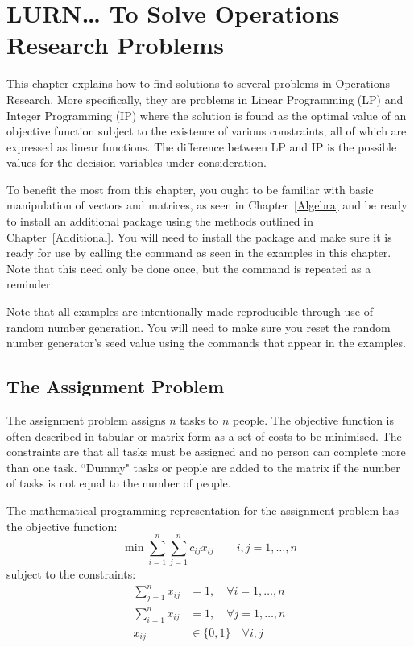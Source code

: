 



\chapter{LURN\ldots{} To Solve Operations Research Problems}
\label{OperRes}




This chapter explains how to find solutions to several problems in Operations Research. More specifically, they are problems in Linear Programming (LP) and Integer Programming (IP) where the solution is found as the optimal value of an objective function subject to the existence of various constraints, all of which are expressed as linear functions. The difference between LP and IP is the possible values for the decision variables under consideration.

To benefit the most from this chapter, you ought to be familiar with basic manipulation of vectors and matrices, as seen in Chapter~\ref{Algebra}  and be ready to install an additional package using the methods outlined in Chapter~\ref{Additional}. You will need to install the  package and make sure it is ready for use by calling the  command as seen in the examples in this chapter. Note that this need only be done once, but the command is repeated as a reminder.

Note that all examples are intentionally made reproducible through use of random number generation. You will need to make sure you reset the random number generator's seed value using the  commands that appear in the examples.


\section{The Assignment Problem}

The assignment problem assigns $n$ tasks to $n$ people. The objective function is often described in tabular or matrix form as a set of costs to be minimised. The constraints are that all tasks must be assigned and no person can complete more than one task. ``Dummy" tasks or people are added to the matrix if the number of tasks is not equal to the number of people. 

The mathematical programming representation for the assignment problem has the objective function:\begin{equation}\label{OperResAssObj}
\min{ \sum_{i=1}^n {\sum_{j=1}^n {c_{ij}x_{ij}}}} \qquad i,j=1,\ldots,n
\end{equation}
subject to the constraints:
\begin{eqnarray*}
\sum_{j=1}^n {x_{ij}} &=1, \quad \forall  i=1,\ldots,n\\
\sum_{i=1}^n {x_{ij}} &=1, \quad \forall j=1,\ldots,n\\
x_{ij} &\in \{0,1\} \quad \forall i,j\\
\end{eqnarray*}

